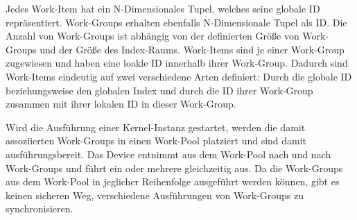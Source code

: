 Jedes Work-Item hat ein N-Dimensionales Tupel, welches seine globale ID repräsentiert.
Work-Groups erhalten ebenfalls N-Dimensionale Tupel als ID.
Die Anzahl von Work-Groups ist abhängig von der definierten Größe von Work-Groups und der Größe des Index-Raums.
Work-Items sind je einer Work-Group zugewiesen und haben eine loakle ID innerhalb ihrer Work-Group.
Dadurch sind Work-Items eindeutig auf zwei verschiedene Arten definiert: Durch die globale ID beziehungsweise den globalen Index und durch die ID ihrer Work-Group zusammen mit ihrer lokalen ID in dieser Work-Group.

Wird die Ausführung einer Kernel-Instanz gestartet, werden die damit assoziierten Work-Groups in einen Work-Pool platziert und sind damit ausführungsbereit.
Das Device entnimmt aus dem Work-Pool nach und nach Work-Groups und führt ein oder mehrere gleichzeitig aus.
Da die Work-Groups aus dem Work-Pool in jeglicher Reihenfolge ausgeführt werden können, gibt es keinen sicheren Weg, verschiedene Ausführungen von Work-Groups zu synchronisieren.

